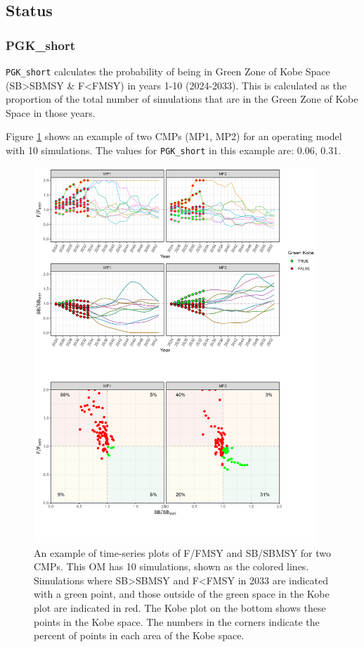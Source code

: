 \documentclass[
]{article}
\begin{document}
\hypertarget{status}{%
\subsection{Status}\label{status}}

\hypertarget{pgk_short}{%
\subsubsection{PGK\_short}\label{pgk_short}}

\texttt{PGK\_short} calculates the probability of being in Green Zone of Kobe Space (SB\textgreater SBMSY \& F\textless FMSY) in years 1-10 (2024-2033). This is calculated as the proportion of the total number of simulations that are in the Green Zone of Kobe Space in those years.

Figure \ref{fig:PGKshort} shows an example of two CMPs (MP1, MP2) for an operating model with 10 simulations. The values for \texttt{PGK\_short} in this example are: 0.06, 0.31.

\begin{figure}
\includegraphics[width=400px]{../../img/PMs/PGK_short} \caption{An example of time-series plots of F/FMSY and SB/SBMSY for two CMPs. This OM has 10 simulations, shown as the colored lines. Simulations where SB>SBMSY and F<FMSY in 2033 are indicated with a green point, and those outside of the green space in the Kobe plot are indicated in red. The Kobe plot on the bottom shows these points in the Kobe space. The numbers in the corners indicate the percent of points in each area of the Kobe space.}\label{fig:PGKshort}
\end{figure}
\end{document}
